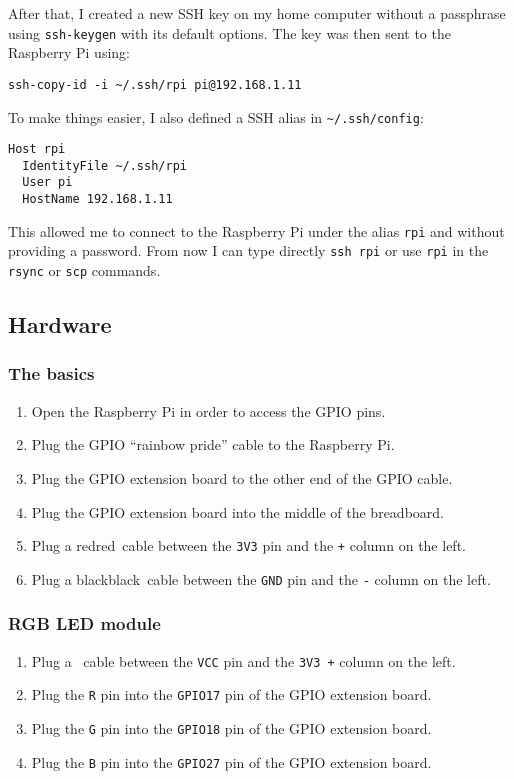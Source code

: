 \documentclass[11pt,a4paper]{article}
\newcommand{\rpi}{Raspberry Pi\xspace}
\newcommand{\plugmodule}[2]{Plug the \texttt{#1} pin into the \texttt{#2} pin of the GPIO extension board.}
\newcommand{\plugcolumn}[4]{Plug a {#1\def\temp{#1}\ifx\temp\empty\else\ \fi}cable between the \texttt{#2} pin and the \texttt{#3} column on the #4.}
\begin{document}
After that, I created a new SSH key on my home computer without a passphrase using \texttt{ssh-keygen} with its default options. The key was then sent to the \rpi using:
\begin{verbatim}
ssh-copy-id -i ~/.ssh/rpi pi@192.168.1.11
\end{verbatim}

To make things easier, I also defined a SSH alias in \verb|~/.ssh/config|:
\begin{verbatim}
Host rpi
  IdentityFile ~/.ssh/rpi
  User pi
  HostName 192.168.1.11
\end{verbatim}

This allowed me to connect to the \rpi under the alias \texttt{rpi} and without providing a password. From now I can type directly \texttt{ssh rpi} or use \texttt{rpi} in the \texttt{rsync} or \texttt{scp} commands.

\subsection{Hardware}

\subsubsection{The basics}

\begin{enumerate}
  \item	Open the \rpi in order to access the GPIO pins.
  \item	Plug the GPIO ``rainbow pride'' cable to the \rpi.
  \item	Plug the GPIO extension board to the other end of the GPIO cable.
  \item	Plug the GPIO extension board into the middle of the breadboard.
  \item	\plugcolumn{red}{3V3}{+}{left}
  \item	\plugcolumn{black}{GND}{-}{left}
\end{enumerate}

\subsubsection{RGB LED module}

\begin{enumerate}
  \item	\plugcolumn{}{VCC}{3V3 +}{left}
  \item	\plugmodule{R}{GPIO17}
  \item	\plugmodule{G}{GPIO18}
  \item	\plugmodule{B}{GPIO27}
\end{enumerate}
\end{document}
